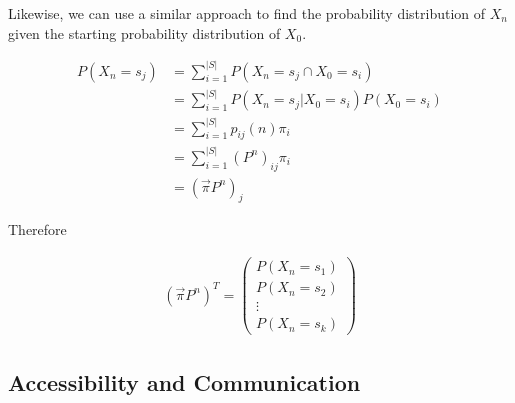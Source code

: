 \documentclass[a4paper,12pt]{article}
\theoremstyle{definition}
\begin{document}
Likewise, we can use a similar approach to find the probability distribution of $X_n$ given the starting probability distribution of $X_0$. 

	\begin{equation*}
	\begin{aligned}
		P(X_n = s_j) &= \sum_{i=1}^{|S|} P(X_n = s_j \cap X_0 = s_i) \\
				 	 &= \sum_{i=1}^{|S|} P(X_n = s_j | X_0 = s_i)P(X_0 = s_i) \\
			     	 &= \sum_{i=1}^{|S|} p_{ij}(n)\pi_i \\
			     	 &= \sum_{i=1}^{|S|} (P^n)_{ij}\pi_i \\
			     	 &= (\vec{\pi}P^n)_j
	\end{aligned}
	\end{equation*}	
	
	Therefore
	
	\begin{equation*}
	\begin{aligned}
		 (\vec{\pi}P^n)^T =
		 \begin{pmatrix}
		 P(X_n = s_1) \\
		 P(X_n = s_2) \\ 
		 \vdots \\
		 P(X_n = s_k)
		 \end{pmatrix}
	\end{aligned}
	\end{equation*}
	
\subsection*{Accessibility and Communication}
\end{document}
